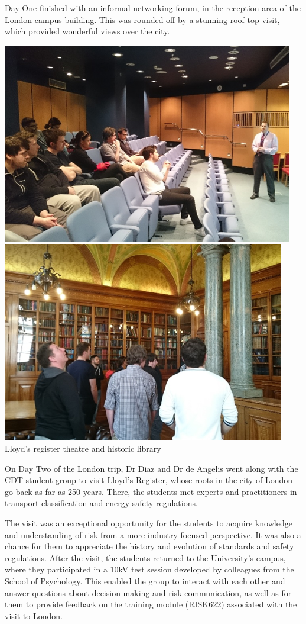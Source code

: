 \documentclass[11pt]{article}%
\begin{document}
\begin{minipage}{1.\textwidth}
\begin{multicols}{2}
Day One finished with an informal networking forum, in the reception area of the London campus building. This was rounded-off by a stunning roof-top visit, which provided wonderful views over the city. 

\includegraphics[width=0.5\linewidth]{training/Picture3.png}
\includegraphics[width=0.485\linewidth]{training/Picture4.png}\\
{\footnotesize Lloyd's register theatre and historic library}

On Day Two of the London trip, Dr Diaz and Dr de Angelis went along with the CDT student group to visit Lloyd’s Register, whose roots in the city of London go back as far as 250 years. There, the students met experts and practitioners in transport classification and energy safety regulations. 

The visit was an exceptional opportunity for the students to acquire knowledge and understanding of risk from a more industry-focused perspective. It was also a chance for them to appreciate the history and evolution of standards and safety regulations. 
After the visit, the students returned to the University’s campus, where they participated in a 10kV test session developed by colleagues from the School of Psychology. This enabled the group to interact with each other and answer questions about decision-making and risk communication, as well as for them to provide feedback on the training module (RISK622) associated with the visit to London.\\
\BackToContents
\end{multicols}

\end{minipage}
\end{document}
